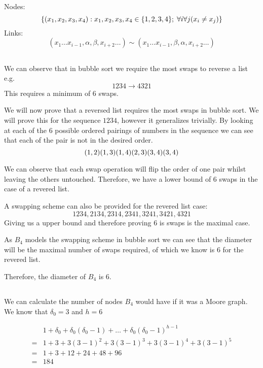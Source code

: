 \section{}
\subsection{}
Nodes:
\[\{(x_1, x_2, x_3, x_4): x_1,x_2,x_3,x_4 \in \{1,2,3,4\} ;\; \forall i \forall j (x_i\neq x_j)\}\]
Links: 
\[
    (x_1 \ldots x_{i-1}, \alpha, \beta, x_{i+2} \ldots)\sim (x_1 \ldots x_{i-1}, \beta, \alpha, x_{i+2} \ldots)
\]

\subsection{}
We can observe that in bubble sort we require the most swaps to reverse a list e.g.
\[1234 \rightarrow 4321\]
This requires a minimum of 6 swaps.

We will now prove that a reversed list requires the most swaps in bubble sort.
We will prove this for the sequence $1234$, however it generalizes trivially.
By looking at each of the 6 possible ordered pairings of numbers in the sequence we can see that each of the pair is not in the desired order. 
\[ (1,2) (1,3) (1,4)\\
    (2,3) (3,4)\\
    (3,4)
\]

We can observe that each swap operation will flip the order of one pair whilst leaving the others untouched. 
Therefore, we have a lower bound of 6 swaps in the case of a revered list. 

A swapping scheme can also be provided for the revered list case: 
\[
    1234, 2134, 2314, 2341, 3241, 3421, 4321
\]
Giving us a upper bound and therefore proving 6 is swaps is the maximal case.

As $B_4$ models the swapping scheme in bubble sort we can see that the diameter will be the maximal number of swaps required, of which we know is 6 for the revered list.

Therefore, the diameter of $B_4$ is 6.

\subsection{}
We can calculate the number of nodes $B_4$ would have if it was a Moore graph.
We know that $\delta_0 = 3$ and $h=6$

\begin{align*}
&1+\delta_0 + \delta_0(\delta_0-1)+\ldots+\delta_0(\delta_0-1)^{h-1} \\
    =&1 + 3 + 3(3-1)^2 + 3(3-1)^3 + 3(3-1)^4 + 3(3-1)^5\\
    = &1+ 3 + 12 +24+48+96 \\
    = &184
\end{align*}

